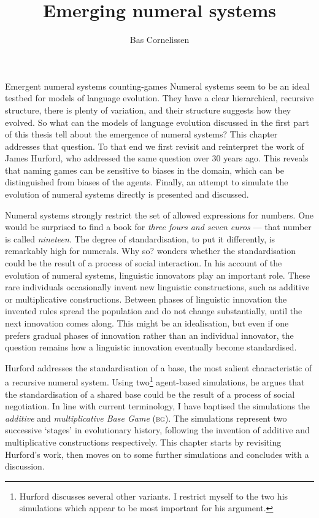 \documentclass{../src/bcthesispart}
\title{Emerging numeral systems}
\author{Bas Cornelissen}
\begin{document}
%
	{Emergent numeral systems}
	{counting-games}{%
	Numeral systems seem to be an ideal testbed for models of language evolution.
	They have a clear hierarchical, recursive structure, there is plenty of variation, and their structure suggests how they evolved.
	So what can the models of language evolution discussed in the first part of this thesis tell about the emergence of numeral systems?
	This chapter addresses that question.
	To that end we first revisit and reinterpret the work of James Hurford, who addressed the same question over 30 years ago.
	This reveals that naming games can be sensitive to biases in the domain, which can be distinguished from biases of the agents. 
	Finally, an attempt to simulate the evolution of numeral systems directly is presented and discussed.
	}





\noindent
Numeral systems strongly restrict the set of allowed expressions for numbers.
One would be surprised to find a book for \emph{three fours and seven euros} — that number is called \emph{nineteen}. 
The degree of standardisation, to put it differently, is remarkably high for numerals.
Why so?
\textcite{Hurford1987} wonders whether the standardisation could be the result of a process of social interaction.
In his  account of the evolution of numeral systems, linguistic innovators play an important role.
These rare individuals occasionally invent new linguistic constructions, such as additive or multiplicative constructions.
Between phases of linguistic innovation the invented rules spread the population and do not change substantially, until the next innovation comes along.
This might be an idealisation, but even if one prefers gradual phases of innovation rather than an individual innovator, the question remains how a linguistic innovation eventually become standardised.



Hurford addresses the standardisation of a base, the most salient characteristic of a recursive numeral system.
Using two\footnote{%
	Hurford discusses several other variants. I restrict myself to the two  his simulations which appear to be most important for his argument.
	}
agent-based simulations, he argues that the standardisation of a shared base could be the result of a process of social negotiation.
In line with current terminology, I have baptised the simulations the \emph{additive} and \emph{multiplicative Base Game} (\textsc{bg}).
The simulations represent two successive ‘stages’ in evolutionary history, following the invention of additive and multiplicative constructions respectively.
This chapter starts by revisiting Hurford’s work, then moves on to some further simulations and concludes with a discussion.
\end{document}
